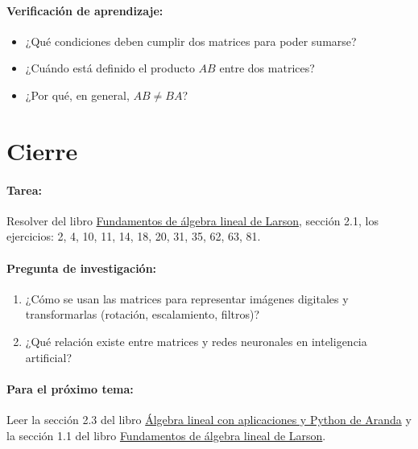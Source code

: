 \documentclass[a4,11pt]{aleph-notas}
\begin{document}
\paragraph{Verificación de aprendizaje:}  
\begin{itemize}[leftmargin=*]  
    \item ¿Qué condiciones deben cumplir dos matrices para poder sumarse?  
    \item ¿Cuándo está definido el producto $AB$ entre dos matrices?  
    \item ¿Por qué, en general, $AB \neq BA$?  
\end{itemize}  

\section*{Cierre}  

\paragraph{Tarea:}  
Resolver del libro \href{https://catalogobiblioteca.puce.edu.ec/cgi-bin/koha/opac-detail.pl?biblionumber=86081}{Fundamentos de álgebra lineal de Larson}, sección 2.1, los ejercicios: 2, 4, 10, 11, 14, 18, 20, 31, 35, 62, 63, 81.

\paragraph{Pregunta de investigación:}  
\begin{enumerate}[leftmargin=*]  
    \item ¿Cómo se usan las matrices para representar imágenes digitales y transformarlas (rotación, escalamiento, filtros)?
    \item ¿Qué relación existe entre matrices y redes neuronales en inteligencia artificial?
\end{enumerate}  

\paragraph{Para el próximo tema:}  
Leer la sección 2.3 del libro \href{https://catalogobiblioteca.puce.edu.ec/cgi-bin/koha/opac-detail.pl?biblionumber=283260}{Álgebra lineal con aplicaciones y Python de Aranda} y la sección 1.1 del libro \href{https://catalogobiblioteca.puce.edu.ec/cgi-bin/koha/opac-detail.pl?biblionumber=86081}{Fundamentos de álgebra lineal de Larson}.
\end{document}
